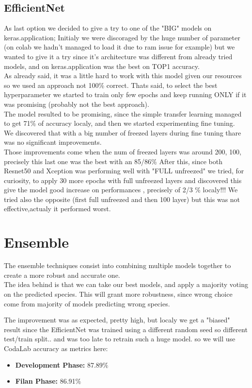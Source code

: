 \documentclass[10pt]{article}
\begin{document}
\subsection{EfficientNet}
As last option we decided to give a try to one of the "BIG" models on keras.application;
Initialy we were discoraged by the huge number of parameter (on colab we hadn't managed to load it due to ram issue for example)
but we wanted to give it a try since it's architecture was different from already tried models, and on keras.application was the best on TOP1 accuracy.\\
As already said, it was a little hard to work with this model given our resources so we used an approach not 100\% correct.
Thats said, to select the best hyperparameter we started to train only few epochs and keep running ONLY if it was promising (probably not the best approach).\\
The model resulted to be promising, since the simple transfer learning managed to get 71\% of accuracy localy, and then we started experimenting fine tuning.\\
We discovered that with a big number of freezed layers during fine tuning thare was no significant improvements.\\
Those improvements come when the num of freezed layers was around 200, 100, precisely this last one was the best with an 85/86\% 
After this, since both Resnet50 and Xception was performing well with "FULL unfreezed" we tried, for curiosity, to apply 30 more epochs with full unfreezed layers and discovered this give the model good increase on performances , precisely of 2/3 \% localy!!!
We tried also the opposite (first full unfreezed and then 100 layer) but this was not effective,actualy it performed worst.


\section{Ensemble}
The ensemble techniques consist into combining multiple models together to create a more robust and accurate one.\\
The idea behind is that we can take our best models, and apply a majority voting on the predicted species.
This will grant more robustness, since wrong choice come from majority of models predicting wrong species.

The improvement was as expected, pretty high, but localy we get a "biased" result since the EfficientNet was trained using a different random seed so different test/train split.. and was too late to retrain such a huge model.
so we will use CodaLab accuracy as metrics here:
\begin{itemize}
  \item \textbf{Development Phase:} 87.89\%
  \item \textbf{Filan Phase:} 86.91\%
\end{itemize}
\end{document}
